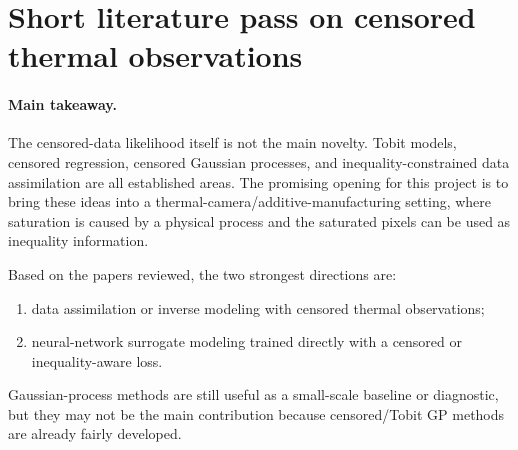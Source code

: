\section{Short literature pass on censored thermal observations}

\paragraph{Main takeaway.}
The censored-data likelihood itself is not the main novelty. Tobit models, censored regression, censored Gaussian processes, and inequality-constrained data assimilation are all established areas. The promising opening for this project is to bring these ideas into a thermal-camera/additive-manufacturing setting, where saturation is caused by a physical process and the saturated pixels can be used as inequality information.

Based on the papers reviewed, the two strongest directions are:
\begin{enumerate}
    \item data assimilation or inverse modeling with censored thermal observations;
    \item neural-network surrogate modeling trained directly with a censored or inequality-aware loss.
\end{enumerate}
Gaussian-process methods are still useful as a small-scale baseline or diagnostic, but they may not be the main contribution because censored/Tobit GP methods are already fairly developed.

